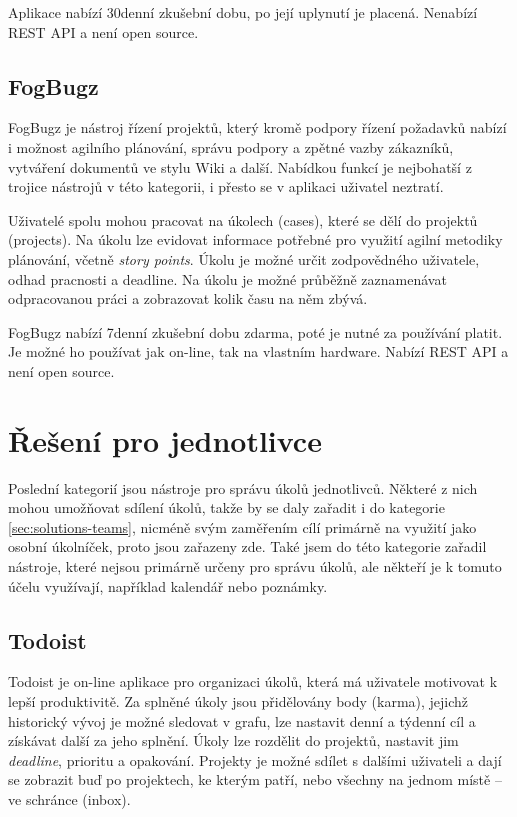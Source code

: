 \documentclass[thesis=B,czech]{FITthesis}[2012/06/26]
\begin{document}
			Aplikace nabízí 30denní zkušební dobu, po její uplynutí je placená. Nenabízí REST API a není open source.
			
		\subsection{FogBugz}
			FogBugz \cite{fogbugz} je nástroj řízení projektů, který kromě podpory řízení požadavků nabízí i možnost agilního plánování\cite{agile-planning}, správu podpory a zpětné vazby zákazníků, vytváření dokumentů ve stylu Wiki a další. Nabídkou funkcí je nejbohatší z trojice nástrojů v této kategorii, i přesto se v aplikaci uživatel neztratí. 
			
			Uživatelé spolu mohou pracovat na úkolech (cases), které se dělí do projektů (projects). Na úkolu lze evidovat informace potřebné pro využití agilní metodiky plánování, včetně \textit{story points}. Úkolu je možné určit zodpovědného uživatele, odhad pracnosti a deadline. Na úkolu je možné průběžně zaznamenávat odpracovanou práci a zobrazovat kolik času na něm zbývá.
			
			FogBugz nabízí 7denní zkušební dobu zdarma, poté je nutné za používání platit. Je možné ho používat jak on-line, tak na vlastním hardware. Nabízí REST API a není open source.

	\section{Řešení pro jednotlivce}
		\label{sec:solutions-individuals}
		Poslední kategorií jsou nástroje pro správu úkolů jednotlivců. Některé z nich mohou umožňovat sdílení úkolů, takže by se daly zařadit i do kategorie \ref{sec:solutions-teams}, nicméně svým zaměřením cílí primárně na využití jako osobní úkolníček, proto jsou zařazeny zde. Také jsem do této kategorie zařadil nástroje, které nejsou primárně určeny pro správu úkolů, ale někteří je k tomuto účelu využívají, například kalendář nebo poznámky.
		
		\subsection{Todoist}
			Todoist \cite{todoist} je on-line aplikace pro organizaci úkolů, která má uživatele motivovat k lepší produktivitě. Za splněné úkoly jsou přidělovány body (karma), jejichž historický vývoj je možné sledovat v grafu, lze nastavit denní a týdenní cíl a získávat další  za jeho splnění. Úkoly lze rozdělit do projektů, nastavit jim \textit{deadline}, prioritu a opakování. Projekty je možné sdílet s dalšími uživateli a dají se zobrazit buď po projektech, ke kterým patří, nebo všechny na jednom místě -- ve schránce (inbox). 
			
\end{document}
